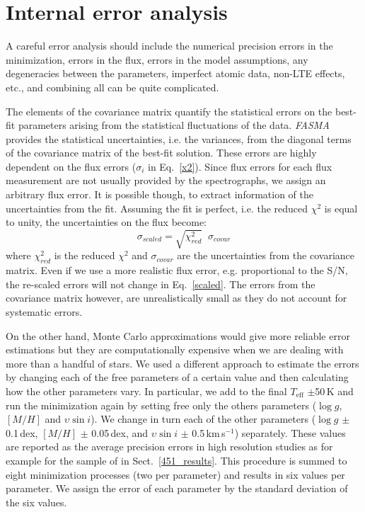 \documentclass[fleqn,usenatbib]{mnras}
\begin{document}
\section{Internal error analysis}\label{error_analysis}

A careful error analysis should include the numerical precision errors in the minimization, errors in the flux, 
errors in the model assumptions, any degeneracies between the parameters, imperfect atomic data, non-LTE effects, etc., and combining all can be quite complicated.

The elements of the covariance matrix quantify the statistical errors on the best-fit parameters arising from the statistical fluctuations of the data. 
\textit{FASMA} provides the statistical uncertainties, i.e. the variances, from the diagonal terms of the covariance matrix of the best-fit solution. 
These errors are highly dependent on the flux errors ($\sigma_{i}$ in Eq.~\ref{x2}). Since flux errors for each flux measurement are not usually provided by the spectrographs, 
we assign an arbitrary flux error. It is possible though, to extract information of the uncertainties from the fit. Assuming the fit is perfect, i.e. the reduced $\chi^{2}$ is equal to unity, 
the uncertainties on the flux become: 
\begin{equation}\label{scaled}
\sigma_{scaled} = \sqrt{\chi^{2}_{red}} \; \; \sigma_{covar} 
\end{equation}
where $\chi^{2}_{red}$ is the reduced $\chi^{2}$ and $\sigma_{covar}$ are the uncertainties from the covariance matrix. 
Even if we use a more realistic flux error, e.g. proportional to the S/N, the re-scaled errors will not change in Eq.~\ref{scaled}.
The errors from the covariance matrix however, are unrealistically small as they do not account for systematic errors. 

On the other hand, Monte Carlo approximations would give more reliable error estimations but they are computationally expensive when we are dealing with more than a 
handful of stars. We used a different approach to estimate the errors by changing each of the free parameters of a certain value and then calculating how the other parameters vary. 
In particular, we add to the final $T_{\mathrm{eff}}$ $\pm$50\,K and run the minimization again by setting free only the others parameters ($\log g$, $[M/H]$ and $\upsilon\sin i$). 
We change in turn each of the other parameters ($\log g$ $\pm$ 0.1\,dex, $[M/H]$ $\pm$ 0.05\,dex, and $\upsilon\sin i$ $\pm$ 0.5\,km\,s$^{-1}$) separately. 
These values are reported as the average precision errors in high resolution studies as for example for the sample of \cite{sousa2008} in Sect.~\ref{451_results}. 
This procedure is summed to eight minimization processes (two per parameter) and results in six values per parameter. 
We assign the error of each parameter by the standard deviation of the six values.
\end{document}
